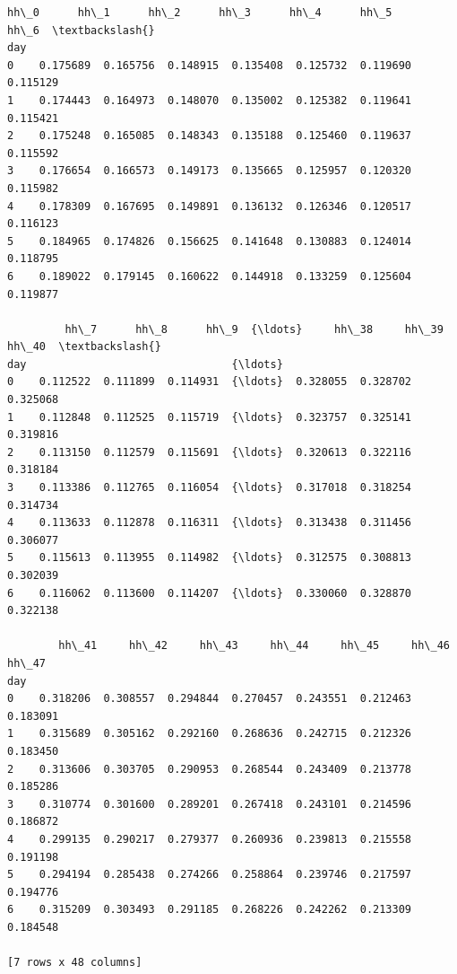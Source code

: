 \documentclass[11pt]{article}
\makeatletter
\newcommand{\boxspacing}{\kern\kvtcb@left@rule\kern\kvtcb@boxsep}
\newcommand{\prompt}[4]{
        {\ttfamily\llap{{\color{#2}[#3]:\hspace{3pt}#4}}\vspace{-\baselineskip}}
    }
\makeatother
\begin{document}
            \begin{tcolorbox}[breakable, size=fbox, boxrule=.5pt, pad at break*=1mm, opacityfill=0]
\prompt{Out}{outcolor}{69}{\boxspacing}
\begin{Verbatim}[commandchars=\\\{\}]
         hh\_0      hh\_1      hh\_2      hh\_3      hh\_4      hh\_5      hh\_6  \textbackslash{}
day
0    0.175689  0.165756  0.148915  0.135408  0.125732  0.119690  0.115129
1    0.174443  0.164973  0.148070  0.135002  0.125382  0.119641  0.115421
2    0.175248  0.165085  0.148343  0.135188  0.125460  0.119637  0.115592
3    0.176654  0.166573  0.149173  0.135665  0.125957  0.120320  0.115982
4    0.178309  0.167695  0.149891  0.136132  0.126346  0.120517  0.116123
5    0.184965  0.174826  0.156625  0.141648  0.130883  0.124014  0.118795
6    0.189022  0.179145  0.160622  0.144918  0.133259  0.125604  0.119877

         hh\_7      hh\_8      hh\_9  {\ldots}     hh\_38     hh\_39     hh\_40  \textbackslash{}
day                                {\ldots}
0    0.112522  0.111899  0.114931  {\ldots}  0.328055  0.328702  0.325068
1    0.112848  0.112525  0.115719  {\ldots}  0.323757  0.325141  0.319816
2    0.113150  0.112579  0.115691  {\ldots}  0.320613  0.322116  0.318184
3    0.113386  0.112765  0.116054  {\ldots}  0.317018  0.318254  0.314734
4    0.113633  0.112878  0.116311  {\ldots}  0.313438  0.311456  0.306077
5    0.115613  0.113955  0.114982  {\ldots}  0.312575  0.308813  0.302039
6    0.116062  0.113600  0.114207  {\ldots}  0.330060  0.328870  0.322138

        hh\_41     hh\_42     hh\_43     hh\_44     hh\_45     hh\_46     hh\_47
day
0    0.318206  0.308557  0.294844  0.270457  0.243551  0.212463  0.183091
1    0.315689  0.305162  0.292160  0.268636  0.242715  0.212326  0.183450
2    0.313606  0.303705  0.290953  0.268544  0.243409  0.213778  0.185286
3    0.310774  0.301600  0.289201  0.267418  0.243101  0.214596  0.186872
4    0.299135  0.290217  0.279377  0.260936  0.239813  0.215558  0.191198
5    0.294194  0.285438  0.274266  0.258864  0.239746  0.217597  0.194776
6    0.315209  0.303493  0.291185  0.268226  0.242262  0.213309  0.184548

[7 rows x 48 columns]
\end{Verbatim}
\end{tcolorbox}
        
\end{document}
